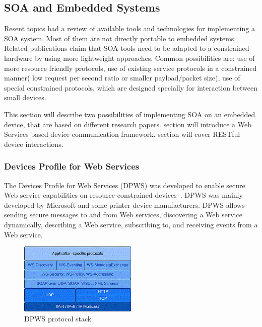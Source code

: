 \subsection{SOA and Embedded Systems}

Resent topics had a review of available tools and technologies for implementing a
SOA system. Most of them are not directly portable to embedded systems.
Related publications \cite{5470528, dguinard-rest-vs-ws} claim that SOA
tools need to be adapted to a constrained hardware by using more lightweight approaches.
Common possibilities are: use of more resource friendly protocols, use of
existing service protocols in a constrained manner( low request per second
ratio or smaller payload/packet size), use of special constrained protocols,
which are designed specially for interaction between small devices.

This section will describe two possibilities of implementing SOA on an embedded
device, that are based on different research
papers\cite{coap_survey,4221180}.
 section will introduce a
Web Services based device communication framework.  section
will cover RESTful device interactions.
\subsubsection{Devices Profile for Web Services}
\label{sec:DPWS}
The Devices Profile for Web Services (DPWS) was developed to enable secure Web
service capabilities on resource-constrained devices~\cite{ws4d_dpws}.
DPWS was mainly developed by Microsoft and some printer device manufacturers.
DPWS allows sending secure messages to and from Web services, discovering a Web service dynamically, describing a Web service, subscribing to, and receiving events from a Web service.


\begin{center}
 \begin{figure}[h]
	\centering
	\includegraphics[width=0.5\textwidth]{../images/background/dpws-stack.png}
	\caption{DPWS protocol stack \cite{ws4d_dpws} }
	\label{fig:dpws_protocol_stack}
 \end{figure}
\end{center}


